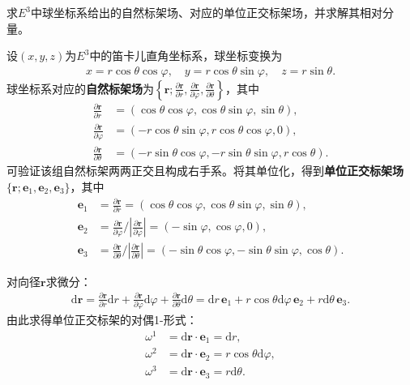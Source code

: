 \documentclass[../../main.tex]{subfiles}%
\begin{document}
\begin{example}
求$E^3$中球坐标系给出的自然标架场、对应的单位正交标架场，并求解其相对分量。
\end{example}
\begin{solution}

设$(x,y,z)$为$E^3$中的笛卡儿直角坐标系，球坐标变换为
\begin{align*}
x = r\cos\theta\cos\varphi,\quad y = r\cos\theta\sin\varphi,\quad z = r\sin\theta.
\end{align*}
球坐标系对应的\textbf{自然标架场}为$\left\{\bm{r};\frac{\partial \bm{r}}{\partial r},\frac{\partial \bm{r}}{\partial \varphi},\frac{\partial \bm{r}}{\partial \theta}\right\}$，其中
\begin{align}
\frac{\partial \bm{r}}{\partial r} &= (\cos\theta\cos\varphi,\cos\theta\sin\varphi,\sin\theta), \nonumber \\
\frac{\partial \bm{r}}{\partial \varphi} &= (-r\cos\theta\sin\varphi,r\cos\theta\cos\varphi,0), \nonumber \\
\frac{\partial \bm{r}}{\partial \theta} &= (-r\sin\theta\cos\varphi,-r\sin\theta\sin\varphi,r\cos\theta). \label{eq:natural-frame-sphere}
\end{align}
可验证该组自然标架两两正交且构成右手系。将其单位化，得到\textbf{单位正交标架场}$\{\bm{r}; \boldsymbol{e}_1,\boldsymbol{e}_2,\boldsymbol{e}_3\}$，其中
\begin{align}
\boldsymbol{e}_1 &= \frac{\partial \bm{r}}{\partial r} = (\cos\theta\cos\varphi,\cos\theta\sin\varphi,\sin\theta), \nonumber \\
\boldsymbol{e}_2 &= \frac{\partial \bm{r}}{\partial \varphi}\bigg/\left|\frac{\partial \bm{r}}{\partial \varphi}\right| = (-\sin\varphi,\cos\varphi,0), \nonumber \\
\boldsymbol{e}_3 &= \frac{\partial \bm{r}}{\partial \theta}\bigg/\left|\frac{\partial \bm{r}}{\partial \theta}\right| = (-\sin\theta\cos\varphi,-\sin\theta\sin\varphi,\cos\theta). \label{eq:ortho-frame-sphere}
\end{align}

对向径$\bm{r}$求微分：
\begin{align}
\mathrm{d}\bm{r} = \frac{\partial \bm{r}}{\partial r}\mathrm{d}r + \frac{\partial \bm{r}}{\partial \varphi}\mathrm{d}\varphi + \frac{\partial \bm{r}}{\partial \theta}\mathrm{d}\theta = \mathrm{d}r\,\boldsymbol{e}_1 + r\cos\theta\mathrm{d}\varphi\,\boldsymbol{e}_2 + r\mathrm{d}\theta\,\boldsymbol{e}_3. \label{eq:dr-sphere}
\end{align}
由此求得单位正交标架的对偶1-形式：
\begin{align}
\omega^1 &= \mathrm{d}\bm{r}\cdot\boldsymbol{e}_1 = \mathrm{d}r, \nonumber \\
\omega^2 &= \mathrm{d}\bm{r}\cdot\boldsymbol{e}_2 = r\cos\theta\mathrm{d}\varphi, \nonumber \\
\omega^3 &= \mathrm{d}\bm{r}\cdot\boldsymbol{e}_3 = r\mathrm{d}\theta. \label{eq:dual-form-sphere}
\end{align}


\end{solution}
\end{document}
